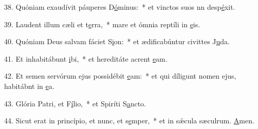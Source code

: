 38. Quóniam exaudívit páuperes D\uline{ó}minus:~* et vinctos suos nn desp\uline{é}xit.\par 
39. Laudent illum cæli et t\uline{e}rra,~* mare et ómnia reptíli in \uline{e}is.\par 
40. Quóniam Deus salvam fáciet S\uline{i}on:~* et ædificabúntur civittes J\uline{u}da.\par 
41. Et inhabitábunt \uline{i}bi,~* et hereditáte acrent \uline{e}am.\par 
42. Et semen servórum ejus possidébit \uline{e}am:~* et qui díligunt nomen ejus, habitábnt in \uline{e}a.\par 
43. Glória Patri, et F\uline{í}lio,~* et Spiríti S\uline{a}ncto.\par 
44. Sicut erat in princípio, et nunc, et s\uline{e}mper,~* et in sǽcula sæculrum. \uline{A}men.\par 
